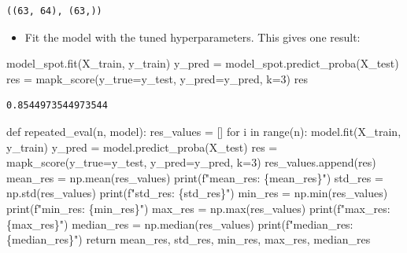 \documentclass[
  letterpaper,
  DIV=11,
  numbers=noendperiod]{scrreprt}
\newenvironment{Shaded}{\begin{snugshade}}{\end{snugshade}}
\newcommand{\BuiltInTok}[1]{\textcolor[rgb]{0.00,0.23,0.31}{#1}}
\newcommand{\ControlFlowTok}[1]{\textcolor[rgb]{0.00,0.23,0.31}{#1}}
\newcommand{\DecValTok}[1]{\textcolor[rgb]{0.68,0.00,0.00}{#1}}
\newcommand{\KeywordTok}[1]{\textcolor[rgb]{0.00,0.23,0.31}{#1}}
\newcommand{\NormalTok}[1]{\textcolor[rgb]{0.00,0.23,0.31}{#1}}
\newcommand{\OperatorTok}[1]{\textcolor[rgb]{0.37,0.37,0.37}{#1}}
\newcommand{\SpecialCharTok}[1]{\textcolor[rgb]{0.37,0.37,0.37}{#1}}
\newcommand{\SpecialStringTok}[1]{\textcolor[rgb]{0.13,0.47,0.30}{#1}}
\providecommand{\tightlist}{%
  \setlength{\itemsep}{0pt}\setlength{\parskip}{0pt}}\usepackage{longtable,booktabs,array}
\begin{document}
\begin{verbatim}
((63, 64), (63,))
\end{verbatim}

\begin{itemize}
\tightlist
\item
  Fit the model with the tuned hyperparameters. This gives one result:
\end{itemize}

\begin{Shaded}
\begin{Highlighting}[]
\NormalTok{model\_spot.fit(X\_train, y\_train)}
\NormalTok{y\_pred }\OperatorTok{=}\NormalTok{ model\_spot.predict\_proba(X\_test)}
\NormalTok{res }\OperatorTok{=}\NormalTok{ mapk\_score(y\_true}\OperatorTok{=}\NormalTok{y\_test, y\_pred}\OperatorTok{=}\NormalTok{y\_pred, k}\OperatorTok{=}\DecValTok{3}\NormalTok{)}
\NormalTok{res}
\end{Highlighting}
\end{Shaded}

\begin{verbatim}
0.8544973544973544
\end{verbatim}

\begin{Shaded}
\begin{Highlighting}[]
\KeywordTok{def}\NormalTok{ repeated\_eval(n, model):}
\NormalTok{    res\_values }\OperatorTok{=}\NormalTok{ []}
    \ControlFlowTok{for}\NormalTok{ i }\KeywordTok{in} \BuiltInTok{range}\NormalTok{(n):}
\NormalTok{        model.fit(X\_train, y\_train)}
\NormalTok{        y\_pred }\OperatorTok{=}\NormalTok{ model.predict\_proba(X\_test)}
\NormalTok{        res }\OperatorTok{=}\NormalTok{ mapk\_score(y\_true}\OperatorTok{=}\NormalTok{y\_test, y\_pred}\OperatorTok{=}\NormalTok{y\_pred, k}\OperatorTok{=}\DecValTok{3}\NormalTok{)}
\NormalTok{        res\_values.append(res)}
\NormalTok{    mean\_res }\OperatorTok{=}\NormalTok{ np.mean(res\_values)}
    \BuiltInTok{print}\NormalTok{(}\SpecialStringTok{f"mean\_res: }\SpecialCharTok{\{}\NormalTok{mean\_res}\SpecialCharTok{\}}\SpecialStringTok{"}\NormalTok{)}
\NormalTok{    std\_res }\OperatorTok{=}\NormalTok{ np.std(res\_values)}
    \BuiltInTok{print}\NormalTok{(}\SpecialStringTok{f"std\_res: }\SpecialCharTok{\{}\NormalTok{std\_res}\SpecialCharTok{\}}\SpecialStringTok{"}\NormalTok{)}
\NormalTok{    min\_res }\OperatorTok{=}\NormalTok{ np.}\BuiltInTok{min}\NormalTok{(res\_values)}
    \BuiltInTok{print}\NormalTok{(}\SpecialStringTok{f"min\_res: }\SpecialCharTok{\{}\NormalTok{min\_res}\SpecialCharTok{\}}\SpecialStringTok{"}\NormalTok{)}
\NormalTok{    max\_res }\OperatorTok{=}\NormalTok{ np.}\BuiltInTok{max}\NormalTok{(res\_values)}
    \BuiltInTok{print}\NormalTok{(}\SpecialStringTok{f"max\_res: }\SpecialCharTok{\{}\NormalTok{max\_res}\SpecialCharTok{\}}\SpecialStringTok{"}\NormalTok{)}
\NormalTok{    median\_res }\OperatorTok{=}\NormalTok{ np.median(res\_values)}
    \BuiltInTok{print}\NormalTok{(}\SpecialStringTok{f"median\_res: }\SpecialCharTok{\{}\NormalTok{median\_res}\SpecialCharTok{\}}\SpecialStringTok{"}\NormalTok{)}
    \ControlFlowTok{return}\NormalTok{ mean\_res, std\_res, min\_res, max\_res, median\_res}
\end{Highlighting}
\end{Shaded}
\end{document}
